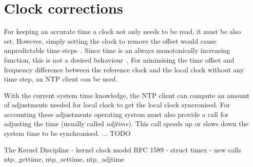 \section{Clock corrections}
For keeping an accurate time a clock not only needs to be read, it must be also set.
However, simply setting the clock to remove the offset would cause unpredictable time steps~\cite{ntp-faq}.
Since time is an always monotonically increasing function, this is not a desired behaviour~\cite{}.
For minimising the time offset and frequency difference between
the reference clock and the local clock without any time step,
an NTP client can be used.

With the current system time knowledge,
the NTP client can compute an amount of adjustments needed for local clock
to get the local clock syncronised.
For accounting these adjustments
operating system must also provide a call
for adjusting the time (usually called {\it{adjtime}}).
This call speeds up or slows down the system time to be synchronised.
... TODO

The Kernel Discipline -  kernel clock model RFC 1589 -
struct timex -
new calls ntp\_gettime, ntp\_settime, ntp\_adjtime

